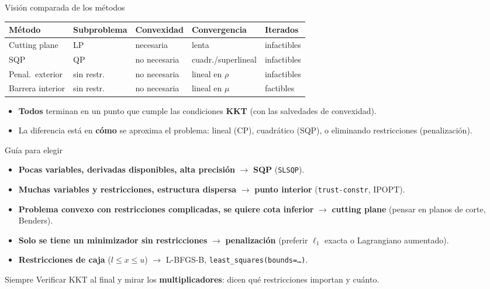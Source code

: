 \documentclass[aspectratio=169]{beamer}
\begin{document}
\begin{frame}{Visión comparada de los métodos}
  \centering\scriptsize
  \begin{tabular}{p{2.5cm}p{2.0cm}p{2.1cm}p{2.1cm}p{2.5cm}}
    \toprule
    \textbf{Método} & \textbf{Subproblema} & \textbf{Convexidad} & \textbf{Convergencia} & \textbf{Iterados}\\
    \midrule
    Cutting plane & LP & necesaria & lenta & infactibles\\
    SQP & QP & no necesaria & cuadr./superlineal & infactibles\\
    Penal.\ exterior & sin restr. & no necesaria & lineal en $\rho$ & infactibles\\
    Barrera interior & sin restr. & no necesaria & lineal en $\mu$ & factibles\\
    \bottomrule
  \end{tabular}

  \normalsize
  \vspace{0.3cm}
  \begin{itemize}
    \item \textbf{Todos} terminan en un punto que cumple las condiciones \textbf{KKT} (con las salvedades de convexidad).
    \item La diferencia está en \textbf{cómo} se aproxima el problema: lineal (CP), cuadrático (SQP), o eliminando restricciones (penalización).
  \end{itemize}
\end{frame}

\begin{frame}{Guía para elegir}
  \begin{itemize}
    \item \textbf{Pocas variables, derivadas disponibles, alta precisión} $\to$ \textbf{SQP} (\texttt{SLSQP}).
    \item \textbf{Muchas variables y restricciones, estructura dispersa} $\to$ \textbf{punto interior} (\texttt{trust-constr}, IPOPT).
    \item \textbf{Problema convexo con restricciones complicadas, se quiere cota inferior} $\to$ \textbf{cutting plane} (pensar en planos de corte, Benders).
    \item \textbf{Solo se tiene un minimizador sin restricciones} $\to$ \textbf{penalización} (preferir $\ell_1$ exacta o Lagrangiano aumentado).
    \item \textbf{Restricciones de caja} ($l\le x\le u$) $\to$ L-BFGS-B, \texttt{least\_squares(bounds=\dots)}.
  \end{itemize}
  \begin{alertblock}{Siempre}
    Verificar KKT al final y mirar los \textbf{multiplicadores}: dicen qué restricciones importan y cuánto.
  \end{alertblock}
\end{frame}
\end{document}
